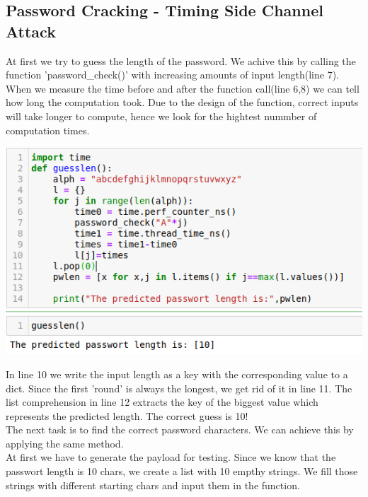 \documentclass[a4paper,10pt]{article}
\begin{document}
\subsection{Password Cracking - Timing Side Channel Attack}
At first we try to guess the length of the password.
We achive this by calling the function 'password\_check()' with increasing amounts of input length(line 7).
When we measure the time before and after the function call(line 6,8) we can tell how long the computation took. Due to the design of the function, correct inputs will take longer to compute, hence we look for the hightest nummber of computation times.
\begin{center}
\includegraphics[scale=0.5]{guesslen.png} 
\end{center}
In line 10 we write the input length as a key with the corresponding value to a dict. Since the first 'round' is always the longest, we get rid of it in line 11.
The list comprehension in line 12 extracts the key of the biggest value which represents the predicted length. The correct guess is 10!\\
The next task is to find the correct password characters. We can achieve this by applying the same method.\\
\newpage
\noindent At first we have to generate the payload for testing. Since we know that the passwort length is 10 chars, we create a list with 10 empthy strings. We fill those strings with different starting chars and input them in the function. 
\end{document}
